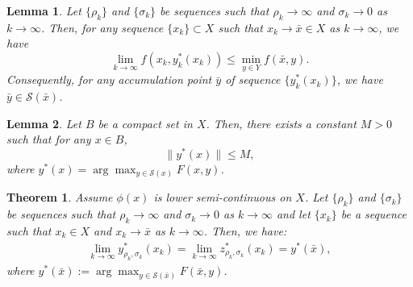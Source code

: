 \documentclass[10pt,a4paper]{amsart}
\newtheorem{theorem}{Theorem}
\newtheorem{lemma}{Lemma}
\begin{document}
\begin{lemma}\label{valueofy}
Let $\{\rho_k\}$ and $\{\sigma_k\}$ be sequences such that $\rho_k \rightarrow \infty$ and $\sigma_k \rightarrow 0$ as $k \rightarrow \infty$. Then, for any sequence $\{x_k\} \subset X$ such that $x_k \rightarrow \bar{x} \in X$ as $k \rightarrow \infty$, we have
	\begin{equation}
	\lim\limits_{k\to\infty}f(x_k,y_{k}^*(x_k))\le  \min_{y \in Y} f(\bar{x}, y).
	\end{equation}
Consequently, for any accumulation point $\bar{y}$ of sequence $\{y_{k}^*(x_k)\}$, we have $\bar{y} \in \mathcal{S}(\bar{x})$.
\end{lemma}

\begin{lemma}\label{lem_a4}
Let $B$ be a compact set in $X$. Then, there exists a constant $M > 0$ such that for any $x \in B$,
 \[
 \|y^*(x)\| \le M,
 \]    
 where $y^*(x) = \arg\max_{y \in \mathcal{S}(x)}F(x,y)$.
\end{lemma}

\begin{theorem}\label{lim_yz}
      Assume $\phi(x)$ is lower semi-continuous on $X$. Let $\{\rho_k\}$ and $\{\sigma_k\}$ be sequences such that $\rho_k \rightarrow \infty$ and $\sigma_k \rightarrow 0$ as $k \rightarrow \infty$ and let $\{x_k\}$ be a sequence such that $x_k \in X$ and $x_k \rightarrow \bar{x}$ as $k \rightarrow \infty$. Then, we have:
    \begin{align}\label{lem_yz_eq}
        \lim_{k\to\infty}y_{\rho_{k}, \sigma_{k}}^*(x_k)=\lim_{{k}\to\infty}z_{\rho_{k}, \sigma_{k}}^*(x_{k})=y^*(\bar{x}),
    \end{align}
    where $y^*(\bar{x}):= \arg\max_{y \in \mathcal{S}(\bar{x})}F(\bar{x},y)$.
\end{theorem}
\end{document}

